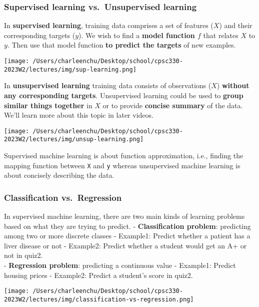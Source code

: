 \documentclass[11pt]{article}
\begin{document}
    

    \subsubsection{Supervised learning vs.~Unsupervised
learning}\label{supervised-learning-vs.-unsupervised-learning}

In \textbf{supervised learning}, training data comprises a set of
features (\(X\)) and their corresponding targets (\(y\)). We wish to
find a \textbf{model function \(f\)} that relates \(X\) to \(y\). Then
use that model function \textbf{to predict the targets} of new examples.

\texttt{[image: /Users/charleenchu/Desktop/school/cpsc330-2023W2/lectures/img/sup-learning.png]}

    In \textbf{unsupervised learning} training data consists of observations
(\(X\)) \textbf{without any corresponding targets}. Unsupervised
learning could be used to \textbf{group similar things together} in
\(X\) or to provide \textbf{concise summary} of the data. We'll learn
more about this topic in later videos.

\texttt{[image: /Users/charleenchu/Desktop/school/cpsc330-2023W2/lectures/img/unsup-learning.png]}

    Supervised machine learning is about function approximation, i.e.,
finding the mapping function between \texttt{X} and \texttt{y} whereas
unsupervised machine learning is about concisely describing the data.

    

    \subsubsection{Classification
vs.~Regression}\label{classification-vs.-regression}

In supervised machine learning, there are two main kinds of learning
problems based on what they are trying to predict. -
\textbf{Classification problem}: predicting among two or more discrete
classes - Example1: Predict whether a patient has a liver disease or not
- Example2: Predict whether a student would get an A+ or not in quiz2.\\
- \textbf{Regression problem}: predicting a continuous value - Example1:
Predict housing prices - Example2: Predict a student's score in quiz2.

    \texttt{[image: /Users/charleenchu/Desktop/school/cpsc330-2023W2/lectures/img/classification-vs-regression.png]}
\end{document}
